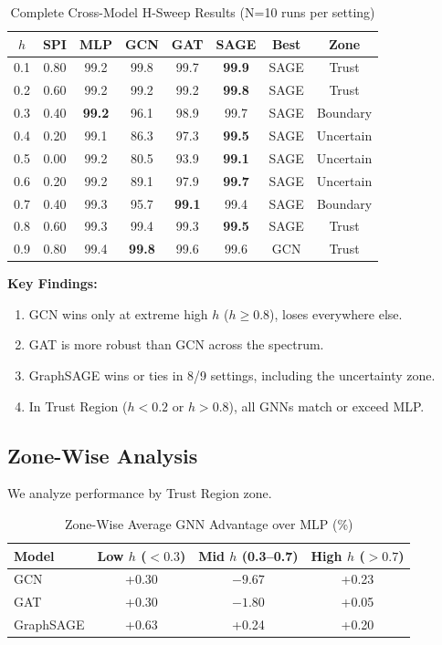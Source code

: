 \begin{table}[t]
\centering
\caption{Complete Cross-Model H-Sweep Results (N=10 runs per setting)}
\label{tab:full_hsweep}
\begin{tabular}{@{}cccccccc@{}}
\toprule
$h$ & SPI & MLP & GCN & GAT & SAGE & Best & Zone \\
\midrule
0.1 & 0.80 & 99.2 & 99.8 & 99.7 & \textbf{99.9} & SAGE & Trust \\
0.2 & 0.60 & 99.2 & 99.2 & 99.2 & \textbf{99.8} & SAGE & Trust \\
0.3 & 0.40 & \textbf{99.2} & 96.1 & 98.9 & 99.7 & SAGE & Boundary \\
0.4 & 0.20 & 99.1 & 86.3 & 97.3 & \textbf{99.5} & SAGE & Uncertain \\
0.5 & 0.00 & 99.2 & 80.5 & 93.9 & \textbf{99.1} & SAGE & Uncertain \\
0.6 & 0.20 & 99.2 & 89.1 & 97.9 & \textbf{99.7} & SAGE & Uncertain \\
0.7 & 0.40 & 99.3 & 95.7 & \textbf{99.1} & 99.4 & SAGE & Boundary \\
0.8 & 0.60 & 99.3 & 99.4 & 99.3 & \textbf{99.5} & SAGE & Trust \\
0.9 & 0.80 & 99.4 & \textbf{99.8} & 99.6 & 99.6 & GCN & Trust \\
\bottomrule
\end{tabular}
\end{table}

\textbf{Key Findings:}
\begin{enumerate}
    \item GCN wins only at extreme high $h$ ($h \geq 0.8$), loses everywhere else.
    \item GAT is more robust than GCN across the spectrum.
    \item GraphSAGE wins or ties in 8/9 settings, including the uncertainty zone.
    \item In Trust Region ($h < 0.2$ or $h > 0.8$), all GNNs match or exceed MLP.
\end{enumerate}

\subsection{Zone-Wise Analysis}

We analyze performance by Trust Region zone.

\begin{table}[t]
\centering
\caption{Zone-Wise Average GNN Advantage over MLP (\%)}
\label{tab:zone_analysis}
\begin{tabular}{@{}lccc@{}}
\toprule
Model & Low $h$ ($<0.3$) & Mid $h$ (0.3--0.7) & High $h$ ($>0.7$) \\
\midrule
GCN & +0.30 & $-9.67$ & +0.23 \\
GAT & +0.30 & $-1.80$ & +0.05 \\
GraphSAGE & +0.63 & +0.24 & +0.20 \\
\bottomrule
\end{tabular}
\end{table}

